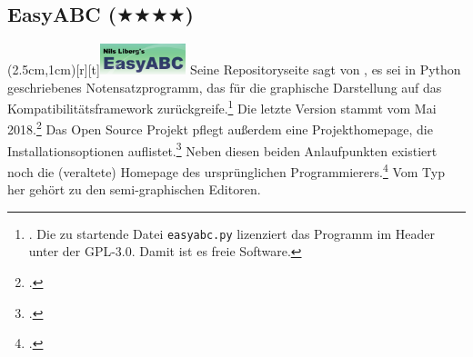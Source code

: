 %
%
%



\subsection{EasyABC ($\bigstar\bigstar\bigstar\bigstar$)}

\parpic(2.5cm,1cm)[r][t]{\includegraphics[width=2.5cm]{logos/easyabc-300dpi.png}}
\label{EasyABC}Seine Repositoryseite sagt von , es sei in Python
geschriebenes Notensatzprogramm, das für die graphische Darstellung auf das
Kompatibilitätsframework 
zurückgreife.\footnote{\cite[vgl.][\nopage wp]{EasyAbc2017a}. Die zu startende
Datei \texttt{easyabc.py} lizenziert das Programm im Header unter der GPL-3.0.
Damit ist es freie Software.} Die letzte Version stammt vom Mai
2018.\footcite[vgl.][\nopage wp]{EasyAbc2017c} Das Open Source Projekt pflegt
außerdem eine Projekthomepage, die Installationsoptionen
auflistet.\footcite[vgl.][\nopage wp]{EasyAbc2017b} Neben diesen beiden
Anlaufpunkten existiert noch die (veraltete) Homepage des ursprünglichen
Programmierers.\footcite[vgl.][\nopage wp]{Liberg2015a} Vom Typ her gehört
 zu den semi-graphischen Editoren.

